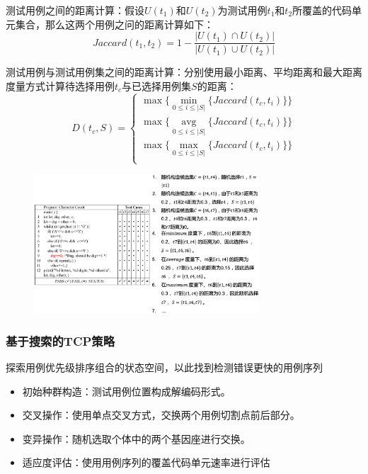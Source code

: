 测试用例之间的距离计算：假设$U(t_1)$和$U(t_2)$为测试用例$t_1$和$t_2$所覆盖的代码单元集合，那么这两个用例之问的距离计算如下：
$$Jaccard(t_1, t_2) = 1-\frac{|U(t_1) \cap U(t_2)|}{|U(t_1) \cup U(t_2)|}$$

测试用例与测试用例集之间的距离计算：分别使用最小距离、平均距离和最大距离度量方式计算待选择用例$t_c$与已选择用例集$S$的距离：
$$
D(t_c, S) = \left\{ \begin{array}{c}
    \max\{\min\limits_{0\leq i \leq |S|} \{Jaccard(t_c,t_i)\}\} \\
    \max\{\mathop{\mathrm{avg}}\limits _{0\leq i \leq |S|} \{Jaccard(t_c,t_i)\}\} \\
    \max\{\max\limits_{0\leq i \leq |S|} \{Jaccard(t_c,t_i)\}\} \\
\end{array}\right.
$$

\begin{figure}[H]
    \vspace{-0.5em}
	\centering
	\includegraphics[width=0.75\textwidth]{images/基于相似性的TCP策略.png}
    \vspace{-1em}
\end{figure}

\subsubsection{基于搜索的TCP策略}
探索用例优先级排序组合的状态空间，以此找到检测错误更快的用例序列
\begin{itemize}
    \item 初始种群构造：测试用例位置构成解编码形式。
    \item 交叉操作：使用单点交叉方式，交换两个用例切割点前后部分。
    \item 变异操作：随机选取个体中的两个基因座进行交换。
    \item 适应度评估：使用用例序列的覆盖代码单元速率进行评估
\end{itemize}

